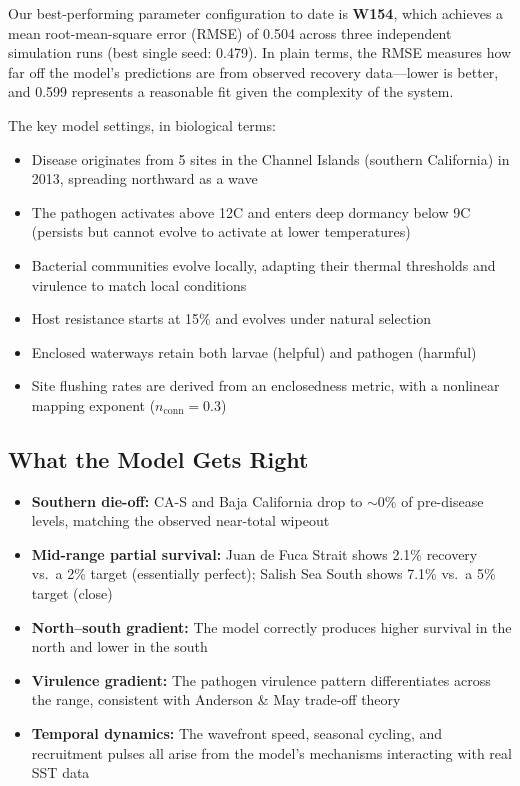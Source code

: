 \documentclass[11pt]{article}
\begin{document}
Our best-performing parameter configuration to date is \textbf{W154}, which achieves a mean root-mean-square error (RMSE) of 0.504 across three independent simulation runs (best single seed: 0.479). In plain terms, the RMSE measures how far off the model's predictions are from observed recovery data---lower is better, and 0.599 represents a reasonable fit given the complexity of the system.

The key model settings, in biological terms:
\begin{itemize}[leftmargin=2em]
    \item Disease originates from 5 sites in the Channel Islands (southern California) in 2013, spreading northward as a wave
    \item The pathogen activates above 12\textdegree C and enters deep dormancy below 9\textdegree C (persists but cannot evolve to activate at lower temperatures)
    \item Bacterial communities evolve locally, adapting their thermal thresholds and virulence to match local conditions
    \item Host resistance starts at 15\% and evolves under natural selection
    \item Enclosed waterways retain both larvae (helpful) and pathogen (harmful)
    \item Site flushing rates are derived from an enclosedness metric, with a nonlinear mapping exponent ($n_{\text{conn}} = 0.3$)
\end{itemize}

\subsection*{What the Model Gets Right}

\begin{itemize}[leftmargin=2em]
    \item \textbf{Southern die-off:} CA-S and Baja California drop to $\sim$0\% of pre-disease levels, matching the observed near-total wipeout
    \item \textbf{Mid-range partial survival:} Juan de Fuca Strait shows 2.1\% recovery vs.\ a 2\% target (essentially perfect); Salish Sea South shows 7.1\% vs.\ a 5\% target (close)
    \item \textbf{North--south gradient:} The model correctly produces higher survival in the north and lower in the south
    \item \textbf{Virulence gradient:} The pathogen virulence pattern differentiates across the range, consistent with Anderson \& May trade-off theory
    \item \textbf{Temporal dynamics:} The wavefront speed, seasonal cycling, and recruitment pulses all arise from the model's mechanisms interacting with real SST data
\end{itemize}
\end{document}
